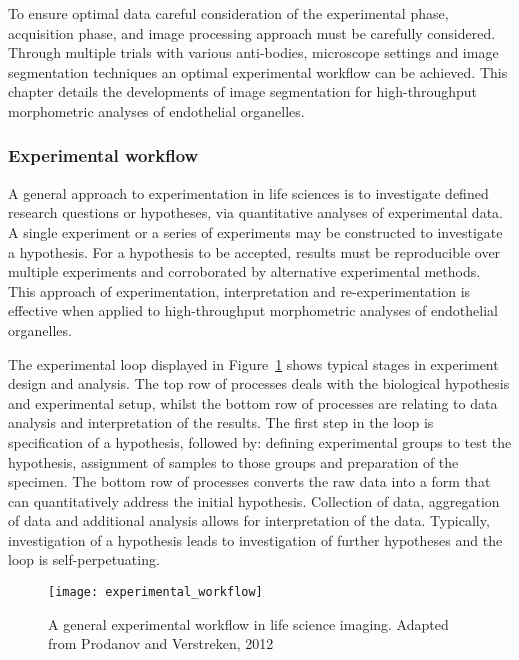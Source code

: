 To ensure optimal data careful consideration of the experimental phase, acquisition phase, and image processing approach must be carefully considered. Through multiple trials with various anti-bodies, microscope settings and image segmentation techniques an optimal experimental workflow can be achieved. This chapter details the developments of image segmentation  for high-throughput morphometric analyses of endothelial organelles.

\subsubsection{Experimental workflow}
A general approach to experimentation in life sciences is to investigate defined research questions or hypotheses, via quantitative analyses of experimental data. A single experiment or a series of experiments may be constructed to investigate a hypothesis. For a hypothesis to be accepted, results must be reproducible over multiple experiments and corroborated by alternative experimental methods. This approach of experimentation, interpretation and re-experimentation is effective when applied to high-throughput morphometric analyses of endothelial organelles.

The experimental loop displayed in Figure~\ref{figure:endothelial_morphometry:introduction:experimental_workflow} shows typical stages in experiment design and analysis. The top row of processes deals with the biological hypothesis and experimental setup, whilst the bottom row of processes are relating to data analysis and interpretation of the results. The first step in the loop is specification of a hypothesis, followed by: defining experimental groups to test the hypothesis, assignment of samples to those groups and preparation of the specimen. The bottom row of processes converts the raw data into a form that can quantitatively address the initial hypothesis. Collection of data, aggregation of data and additional analysis allows for interpretation of the data. Typically, investigation of a hypothesis leads to investigation of further hypotheses and the loop is self-perpetuating.

\begin{figure}[htbp!]
	\centering
	\texttt{[image: experimental\_workflow]}
	\caption[Experimental workflow in life science imaging]{A general experimental workflow in life science imaging. Adapted from Prodanov and Verstreken, 2012~\cite{Prodanov2012}}
	\label{figure:endothelial_morphometry:introduction:experimental_workflow}
\end{figure}

